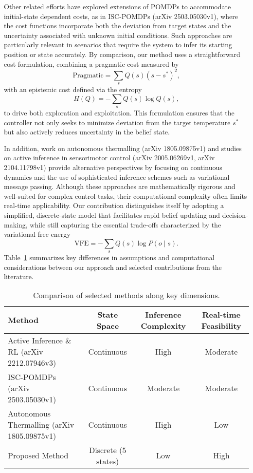 \documentclass[11pt]{article}
\begin{document}
Other related efforts have explored extensions of POMDPs to accommodate initial-state dependent costs, as in ISC-POMDPs (arXiv 2503.05030v1), where the cost functions incorporate both the deviation from target states and the uncertainty associated with unknown initial conditions. Such approaches are particularly relevant in scenarios that require the system to infer its starting position or state accurately. By comparison, our method uses a straightforward cost formulation, combining a pragmatic cost measured by 
\[
\text{Pragmatic} = \sum_{s} Q(s)(s-s^*)^2,
\]
with an epistemic cost defined via the entropy 
\[
H(Q) = -\sum_{s} Q(s)\log Q(s),
\]
to drive both exploration and exploitation. This formulation ensures that the controller not only seeks to minimize deviation from the target temperature \(s^*\) but also actively reduces uncertainty in the belief state.

In addition, work on autonomous thermalling (arXiv 1805.09875v1) and studies on active inference in sensorimotor control (arXiv 2005.06269v1, arXiv 2104.11798v1) provide alternative perspectives by focusing on continuous dynamics and the use of sophisticated inference schemes such as variational message passing. Although these approaches are mathematically rigorous and well-suited for complex control tasks, their computational complexity often limits real-time applicability. Our contribution distinguishes itself by adopting a simplified, discrete-state model that facilitates rapid belief updating and decision-making, while still capturing the essential trade-offs characterized by the variational free energy 
\[
\text{VFE} = -\sum_{s} Q(s)\log P(o\mid s).
\]
Table~\ref{tab:comparison} summarizes key differences in assumptions and computational considerations between our approach and selected contributions from the literature.

\begin{table}[H]
\centering
\begin{tabular}{lccc}
\hline
Method & State Space & Inference Complexity & Real-time Feasibility \\
\hline
Active Inference \& RL (arXiv 2212.07946v3) & Continuous & High & Moderate \\
ISC-POMDPs (arXiv 2503.05030v1) & Continuous & Moderate & Moderate \\
Autonomous Thermalling (arXiv 1805.09875v1) & Continuous & High & Low \\
Proposed Method & Discrete (5 states) & Low & High \\
\hline
\end{tabular}
\caption{Comparison of selected methods along key dimensions.}
\label{tab:comparison}
\end{table}
\end{document}
